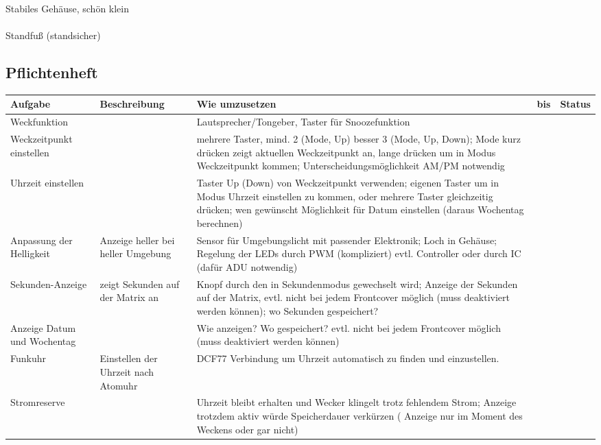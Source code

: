 \documentclass[11pt,a4paper,ngerman]{article}
\begin{document}
Stabiles Gehäuse, schön klein\\
\\
Standfuß (standsicher)\\
\begin{landscape}
\section{Pflichtenheft}


 
\begin{tabular}[]{p{2cm}p{2cm}p{10cm}p{2cm}p{2cm}}
	\toprule
	Aufgabe & Beschreibung & Wie umzusetzen  & bis & Status \\
	\midrule
	Weckfunktion & & Lautsprecher/Tongeber, Taster für Snoozefunktion & & \\
	Weckzeitpunkt einstellen & & mehrere Taster, mind. 2 (Mode, Up) besser 3 (Mode, Up, Down); Mode kurz drücken zeigt aktuellen Weckzeitpunkt an, lange drücken um in Modus Weckzeitpunkt kommen; Unterscheidungsmöglichkeit AM/PM notwendig \\
	Uhrzeit einstellen & & Taster Up (Down) von Weckzeitpunkt verwenden; eigenen Taster um in Modus Uhrzeit einstellen zu kommen, oder mehrere Taster gleichzeitig drücken; wen gewünscht Möglichkeit für Datum einstellen (daraus Wochentag berechnen) \\
	Anpassung der Helligkeit & Anzeige heller bei heller Umgebung & Sensor für Umgebungslicht mit passender Elektronik; Loch in Gehäuse; Regelung der LEDs durch PWM (kompliziert) evtl. Controller oder durch IC (dafür ADU notwendig) \\
	Sekunden-Anzeige & zeigt Sekunden auf der Matrix an & Knopf durch den in Sekundenmodus gewechselt wird; Anzeige der Sekunden auf der Matrix, evtl. nicht bei jedem Frontcover möglich (muss deaktiviert werden können); wo Sekunden gespeichert? \\
	Anzeige Datum und Wochentag & & Wie anzeigen? Wo gespeichert? evtl. nicht bei jedem Frontcover möglich (muss deaktiviert werden können) \\
	Funkuhr & Einstellen der Uhrzeit nach Atomuhr & DCF77 Verbindung um Uhrzeit automatisch zu finden und einzustellen.\\
	Stromreserve & & Uhrzeit bleibt erhalten und Wecker klingelt trotz fehlendem Strom; Anzeige trotzdem aktiv würde Speicherdauer verkürzen ( Anzeige nur im Moment des Weckens oder gar nicht)\\
\end{tabular}

\end{landscape}
\end{document}
